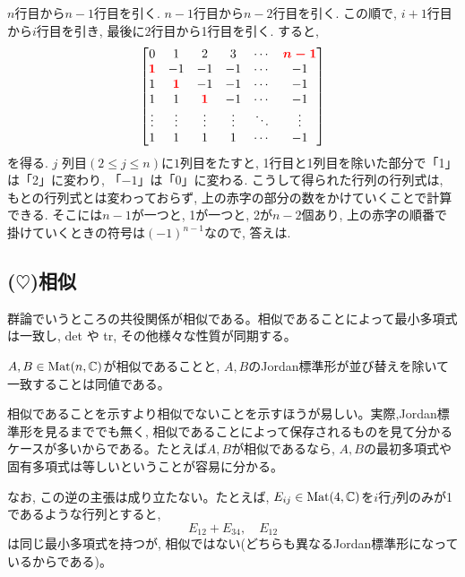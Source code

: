 \begin{egans}
$n$行目から$n-1$行目を引く. $n-1$行目から$n-2$行目を引く. この順で, $i+1$行目から$i$行目を引き, 最後に$2$行目から1行目を引く. すると,
\[
\begin{bmatrix}
0 & 1 & 2 & 3 & \cdots & \textcolor{red}{{\mbox{\boldmath $n-1$}}} \\
\textcolor{red}{{\mbox{\boldmath $1$}}} & -1 & -1 & -1 & \cdots & -1 \\
1 & \textcolor{red}{{\mbox{\boldmath $1$}}} & -1 & -1 & \cdots & -1 \\
1 & 1 & \textcolor{red}{{\mbox{\boldmath $1$}}} & -1 & \cdots & -1 \\
\vdots & \vdots & \vdots & \vdots & \ddots & \vdots \\
1 & 1 & 1 & 1 & \cdots & -1
\end{bmatrix}
\]
を得る. $j$ 列目$(2\leq j\leq n)$に$1$列目をたすと, 1行目と1列目を除いた部分で「1」は「2」に変わり, 「$-1$」は「0」に変わる. こうして得られた行列の行列式は, もとの行列式とは変わっておらず, 上の赤字の部分の数をかけていくことで計算できる. そこには$n-1$が一つと, 1が一つと, 2が$n-2$個あり, 上の赤字の順番で掛けていくときの符号は$(-1)^{n-1}$なので, 答えは.
\end{egans}







\subsection{($\heartsuit$)相似}
群論でいうところの共役関係が相似である。相似であることによって最小多項式は一致し, det や tr, その他様々な性質が同期する。
\besha
\begin{theo}
$A,B\in \mathrm{Mat}(n,\mathbb{C})$が相似であることと, $A,B$のJordan標準形が並び替えを除いて一致することは同値である。
\end{theo}
\ensha
\begin{rem}
相似であることを示すより相似でないことを示すほうが易しい。実際,Jordan標準形を見るまででも無く,  相似であることによって保存されるものを見て分かるケースが多いからである。たとえば$A,B$が相似であるなら, $A,B$の最初多項式や固有多項式は等しいということが容易に分かる。

なお, この逆の主張は成り立たない。たとえば, $E_{ij}\in \mathrm{Mat}(4,\mathbb{C})$を$i$行$j$列のみが1であるような行列とすると, \[E_{12} + E_{34},\quad E_{12}\]
は同じ最小多項式を持つが, 相似ではない(どちらも異なるJordan標準形になっているからである)。
\end{rem}













